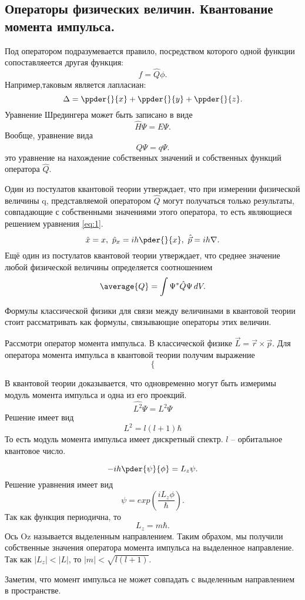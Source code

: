 \subsection{Операторы физических величин. Квантование момента импульса.}
Под оператором подразумевается правило, посредством которого одной функции
сопоставляеется другая функция:
\[
    f = \hat{Q}\phi.
\]
Например,таковым является лапласиан:
\[
    \Delta = \ppder{}{x} + \ppder{}{y} + \ppder{}{z}.
\]
Уравнение Шредингера может быть записано в виде
\[
    \hat{H}\Psi = E\Psi.
\]
Вообще, уравнение вида
\begin{equation}
    \hat{Q}\Psi = q\Psi.
    \label{eq:1}    
\end{equation}
это уравнение на нахождение собственных значений и собственных функций оператора
\( \hat{Q} \).

Один из постулатов квантовой теории утверждает, что при измерении физической
величины q, представляемой оператором  \( \hat{Q} \) могут получаться только
результаты, совпадающие с собственными значениями этого оператора, то есть
являющиеся решением уравнения \ref{eq:1}.
\[
    \hat{x} = x,\ \hat{p}_x = ih\pder{}{x},\ \hat{\vec{p}} = ih\nabla. 
\]
Ещё один из постулатов квантовой теории утверждает, что среднее значение любой
физической величины определяется соотношением
\[
    \average{Q} = \int \Psi^*\hat{Q}\Psi\,dV.
\]

Формулы классической физики для связи между величинами в квантовой теории стоит
рассматривать как формулы, связывающие операторы этих величин.

Рассмотри оператор момента импульса. В классической физике
\( \vec{L} = \vec{r}\times\vec{p} \). Для оператора момента импульса в квантовой
теории получим выражение
\[
    \left\{\right.
\]

В квантовой теории доказывается, что одновременно могут быть измеримы модуль
момента импульса и одна из его проекций.
\[
    \hat{L^2}\Psi = L^2\Psi
\]
Решение имеет вид
\[
    L^2 = l(l+1)\hbar
\]
То есть модуль момента импульса имеет дискретный спектр. \( l \) -- орбитальное
квантовое число.

\[
    -ih\pder{\psi}{\phi} = L_z\psi.
\]
Решение уравнения имеет вид
\[
    \psi = exp(\frac{iL_z\phi}{\hbar}).
\]
Так как функция периодична, то
\[
    L_z = m\hbar.
\]
Ось Oz  называется выделенным направлением. Таким обрахом, мы получили
собственные значения оператора момента импульса на выделенное направление.
Так как \( |L_z| < |L| \), то \( |m| < \sqrt{l(l+1)} \).

Заметим, что момент импульса не может совпадать с выделенным направлением в
пространстве.
